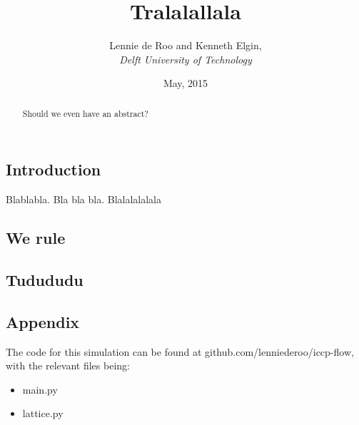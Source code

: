 \documentclass[a4paper]{article}
\begin{document}
\title{\textbf{Tralalallala}}
\author{Lennie de Roo and Kenneth Elgin, \\
 \emph{Delft University of Technology}}
\date{\normalsize{May, 2015}}
\maketitle 
\noindent \hrulefill
\begin{abstract}
{\color{blue}Should we even have an abstract?}
\end{abstract}
\hrulefill
\begin{multicols*}{2}
\subsection*{Introduction}
Blablabla. Bla bla bla. Blalalalalala
\subsection*{We rule}

\subsection*{Tudududu}
\subsection*{Appendix}
The code for this simulation can be found at github.com/lenniederoo/iccp-flow, with the relevant files being:
\begin{itemize}
\item main.py
\item lattice.py
\end{itemize}
\end{multicols*}
\end{document}
